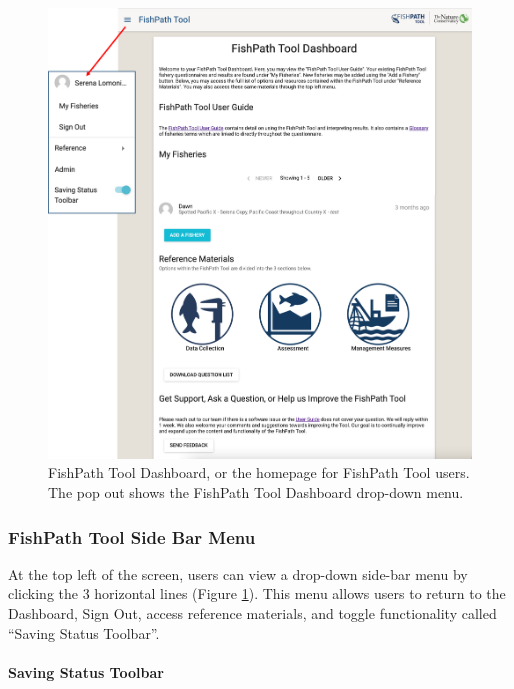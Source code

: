 \documentclass[
  11pt,
]{book}
\begin{document}
\begin{figure}

{\centering \includegraphics[width=0.95\linewidth]{images/user-dashboard} 

}

\caption{FishPath Tool Dashboard, or the homepage for FishPath Tool users. The pop out shows the FishPath Tool Dashboard drop-down menu.}\label{fig:dashboard}
\end{figure}

\hypertarget{fishpath-tool-side-bar-menu}{%
\subsubsection{FishPath Tool Side Bar Menu}\label{fishpath-tool-side-bar-menu}}

At the top left of the screen, users can view a drop-down side-bar menu by clicking the 3 horizontal lines (Figure \ref{fig:dashboard}). This menu allows users to return to the Dashboard, Sign Out, access reference materials, and toggle functionality called ``Saving Status Toolbar''.

\hypertarget{saving-status-toolbar}{%
\paragraph{Saving Status Toolbar}\label{saving-status-toolbar}}
\end{document}
